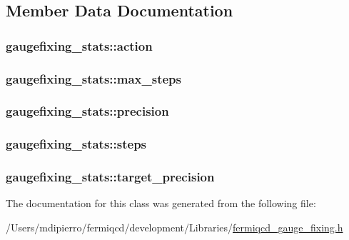 \subsection{Member Data Documentation}
\hypertarget{classgaugefixing__stats_a3804badb47666b7081af146aa669d2f3}{
\subsubsection[{action}]{ {\bf gaugefixing\_\-stats::action}}}
\label{classgaugefixing__stats_a3804badb47666b7081af146aa669d2f3}
\hypertarget{classgaugefixing__stats_a7d7be24b966c51d9bf934d618f300758}{
\subsubsection[{max\_\-steps}]{ {\bf gaugefixing\_\-stats::max\_\-steps}}}
\label{classgaugefixing__stats_a7d7be24b966c51d9bf934d618f300758}
\hypertarget{classgaugefixing__stats_a3262e3d6041404f63ae6ce34a9fef341}{
\subsubsection[{precision}]{ {\bf gaugefixing\_\-stats::precision}}}
\label{classgaugefixing__stats_a3262e3d6041404f63ae6ce34a9fef341}
\hypertarget{classgaugefixing__stats_a92e80b6818b14886ea28265003917acc}{
\subsubsection[{steps}]{ {\bf gaugefixing\_\-stats::steps}}}
\label{classgaugefixing__stats_a92e80b6818b14886ea28265003917acc}
\hypertarget{classgaugefixing__stats_a61c415b209b1c6a150b768b809ca4d08}{
\subsubsection[{target\_\-precision}]{ {\bf gaugefixing\_\-stats::target\_\-precision}}}
\label{classgaugefixing__stats_a61c415b209b1c6a150b768b809ca4d08}


The documentation for this class was generated from the following file:\begin{DoxyCompactItemize}
\item 
/Users/mdipierro/fermiqcd/development/Libraries/\hyperlink{fermiqcd__gauge__fixing_8h}{fermiqcd\_\-gauge\_\-fixing.h}\end{DoxyCompactItemize}
